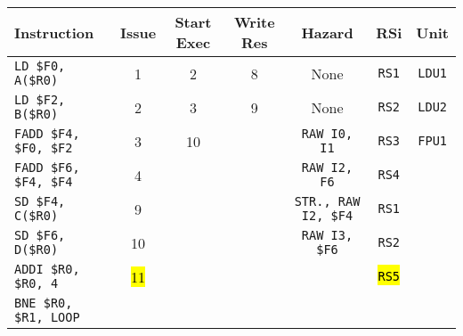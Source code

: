 \begin{enumerate}
    \begin{table}[!htp]
        \centering
        \begin{adjustbox}{width={\textwidth},totalheight={\textheight},keepaspectratio}
        \begin{tabular}{@{} l c c c c c c @{}}
            \toprule
            \textbf{Instruction} & \textbf{Issue} & \textbf{Start Exec} & \textbf{Write Res} & \textbf{Hazard} & \textbf{RSi} & \textbf{Unit} \\
            \midrule
            \texttt{LD \$F0, A(\$R0)}       & 1 & 2 & 8 & None  & \texttt{RS1}   & \texttt{LDU1}  \\ [.5em]
            \texttt{LD \$F2, B(\$R0)}       & 2 & 3 & 9 & None  & \texttt{RS2}   & \texttt{LDU2}  \\ [.5em]
            \texttt{FADD \$F4, \$F0, \$F2}  & 3 & 10 &   & \texttt{RAW I0, I1} & \texttt{RS3} & \texttt{FPU1} \\ [.5em]
            \texttt{FADD \$F6, \$F4, \$F4}  & 4 &   &   & \texttt{RAW I2, F6} & \texttt{RS4} & \\ [.5em]
            \texttt{SD \$F4, C(\$R0)}       & 9 &   &   & \texttt{STR., RAW I2, \$F4} & \texttt{RS1} & \\ [.5em]
            \texttt{SD \$F6, D(\$R0)}       & 10 &   &   & \texttt{RAW I3, \$F6} & \texttt{RS2} &       \\ [.5em]
            \texttt{ADDI \$R0, \$R0, 4}     & \hl{11} &   &   &       & \hl{\texttt{RS5}} &       \\ [.5em]
            \texttt{BNE \$R0, \$R1, LOOP}   &   &   &   &       &       &       \\
            \bottomrule
        \end{tabular}
        \end{adjustbox}
    \end{table}
    

\end{enumerate}
